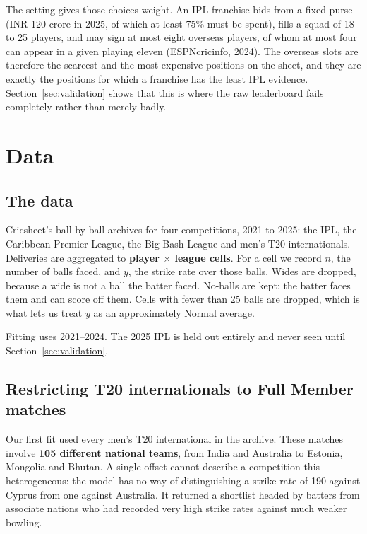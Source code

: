 \documentclass[11pt,a4paper]{article}
\begin{document}
The setting gives those choices weight. An IPL franchise bids from a fixed purse (INR 120
crore in 2025, of which at least 75\% must be spent), fills a squad of 18 to 25 players, and may
sign at most eight overseas players, of whom at most four can appear in a given playing eleven
(ESPNcricinfo, 2024). The overseas slots are therefore the scarcest and the most expensive
positions on the sheet, and they are exactly the positions for which a franchise has the least
IPL evidence. Section~\ref{sec:validation} shows that this is where the raw leaderboard fails
completely rather than merely badly.

\section{Data}\label{sec:data}

\subsection{The data}

Cricsheet's ball-by-ball archives for four competitions, 2021 to 2025: the IPL, the Caribbean
Premier League, the Big Bash League and men's T20 internationals. Deliveries are aggregated to
\textbf{player $\times$ league cells}. For a cell we record $n$, the number of balls faced, and
$y$, the strike rate over those balls. Wides are dropped, because a wide is not a ball the
batter faced. No-balls are kept: the batter faces them and can score off them. Cells with fewer
than 25 balls are dropped, which is what lets us treat $y$ as an approximately Normal average.

Fitting uses 2021--2024. The 2025 IPL is held out entirely and never seen until
Section~\ref{sec:validation}.

\begin{table}[H]
\centering\small

\caption{The four competitions after filtering. ``Run rate'' is the ball-weighted mean
strike rate, which is what a scorecard would report.}
\end{table}

\subsection{Restricting T20 internationals to Full Member matches}

Our first fit used every men's T20 international in the archive. These matches involve
\textbf{105 different national teams}, from India and Australia to Estonia, Mongolia and
Bhutan. A single offset cannot describe a competition this heterogeneous: the model has no way
of distinguishing a strike rate of 190 against Cyprus from one against Australia. It returned a
shortlist headed by batters from associate nations who had recorded very high strike rates
against much weaker bowling.
\end{document}
